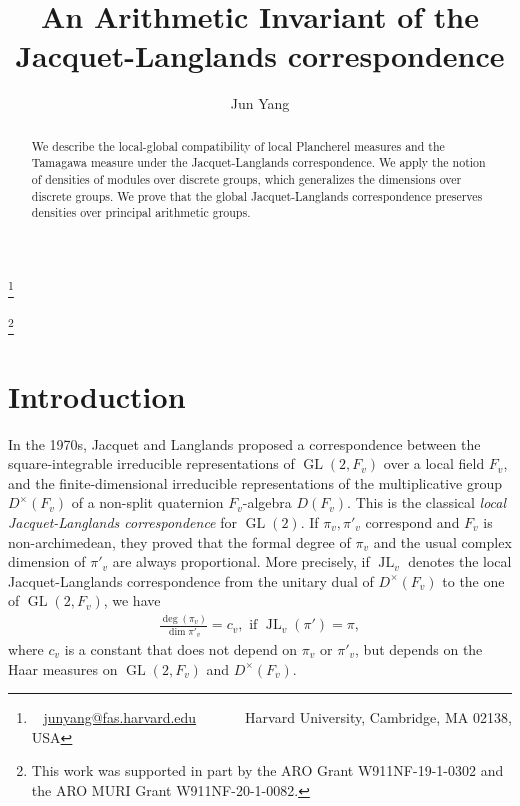 \documentclass[11pt]{article}
\title{An Arithmetic Invariant of the Jacquet-Langlands correspondence}
\author{Jun Yang}
\date{}
\newcommand\blfootnote[1]{%
  \begingroup
  \renewcommand\thefootnote{}\footnote{#1}%
  \addtocounter{footnote}{-1}%
  \endgroup
}
\theoremstyle{plain}
\theoremstyle{remark}
\theoremstyle{definition}
\DeclareMathOperator{\GL}{GL}
\DeclareMathOperator{\JL}{JL}
\begin{document}
\maketitle
\begin{abstract} 
We describe the local-global compatibility of local Plancherel measures and the Tamagawa measure under the Jacquet-Langlands correspondence. %
We apply the notion of densities of modules over discrete groups, which generalizes the dimensions over discrete groups. 
We prove that the global Jacquet-Langlands correspondence preserves densities over principal arithmetic groups. 
\end{abstract}

\blfootnote{\Letter~ \href{mailto:junyang@fas.harvard.edu}{junyang@fas.harvard.edu}~~~~~~~Harvard University, Cambridge, MA 02138, USA}
\blfootnote{This work was supported in part by the ARO Grant W911NF-19-1-0302 and the ARO MURI Grant W911NF-20-1-0082.}

\tableofcontents

\section{Introduction}



In the 1970s, Jacquet and Langlands proposed a correspondence between the square-integrable irreducible representations of $\GL(2,F_v)$ over a local field $F_v$, and the finite-dimensional irreducible representations of the multiplicative group $D^{\times}(F_v)$ of a non-split 
quaternion $F_v$-algebra $D(F_v)$. 
This is the classical {\it local Jacquet-Langlands correspondence} for $\GL(2)$. 
If $\pi_v,\pi'_v$ correspond and $F_v$ is non-archimedean, they proved that the formal degree of $\pi_v$ and the usual complex dimension of $\pi'_v$ are always proportional. 
More precisely, if $\JL_v$ denotes the local Jacquet-Langlands correspondence from the unitary dual of $D^{\times}(F_v)$ to the one of $\GL(2,F_v)$, we have
\begin{equation}\label{eintrodeg}
\begin{aligned}
     \frac{\deg(\pi_v)}{\dim \pi'_v}=c_v, \text{~if~} \JL_{v}(\pi')=\pi,
\end{aligned}
\end{equation}
where  $c_v$ is a constant that does not depend on  $\pi_v$ or $\pi'_v$, but depends on the Haar measures on $\GL(2,F_v)$ and $D^{\times}(F_v)$. 
\end{document}
